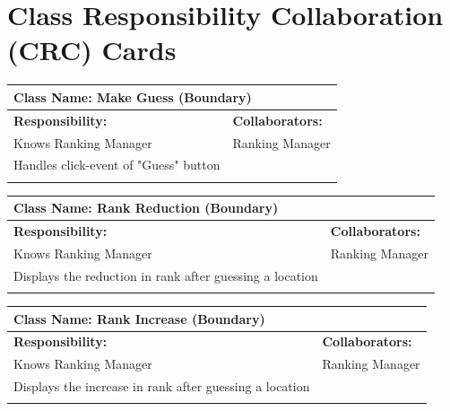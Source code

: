 \documentclass[]{article}
\begin{document}
	
\section{Class Responsibility Collaboration (CRC) Cards}
\label{sec:class_responsibility_collaboration_crc_cards}

	\begin{table}[H]
		\centering
		\begin{tabular}{|p{8cm}|p{8cm}|}
		\hline 
		 \multicolumn{2}{|l|}{\textbf{Class Name:} Make Guess (Boundary)} \\
		\hline
		\textbf{Responsibility:} & \textbf{Collaborators:} \\
		\hline
		Knows Ranking Manager & Ranking Manager \\
		Handles click-event of "Guess" button & \\
		\vspace{1in} & \\
		\hline
		\end{tabular}
	\end{table}
	
	\begin{table}[H]
		\centering
		\begin{tabular}{|p{8cm}|p{8cm}|}
		\hline 
		 \multicolumn{2}{|l|}{\textbf{Class Name:} Rank Reduction (Boundary)} \\
		\hline
		\textbf{Responsibility:} & \textbf{Collaborators:} \\
		\hline
		Knows Ranking Manager & Ranking Manager \\
		Displays the reduction in rank after guessing a location & \\
		\vspace{1in} & \\
		\hline
		\end{tabular}
	\end{table}

	\begin{table}[H]
		\centering
		\begin{tabular}{|p{8cm}|p{8cm}|}
		\hline 
		 \multicolumn{2}{|l|}{\textbf{Class Name:} Rank Increase (Boundary)} \\
		\hline
		\textbf{Responsibility:} & \textbf{Collaborators:} \\
		\hline
		Knows Ranking Manager & Ranking Manager \\
		Displays the increase in rank after guessing a location & \\
		\vspace{1in} & \\
		\hline
		\end{tabular}
	\end{table}
\end{document}
